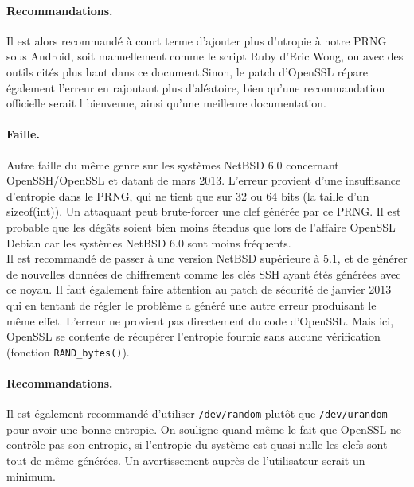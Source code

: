 \paragraph{Recommandations.\\}
Il est alors recommandé à court terme d'ajouter plus d'ntropie à notre PRNG sous Android, soit manuellement comme le script Ruby d'Eric Wong, ou avec des outils cités plus haut dans ce document.Sinon, le patch d'OpenSSL répare également l'erreur en rajoutant plus d'aléatoire, bien qu'une recommandation officielle serait l bienvenue, ainsi qu'une meilleure documentation.

\paragraph{Faille.\\}
Autre faille du même genre sur les systèmes NetBSD 6.0 concernant OpenSSH/OpenSSL et datant de mars 2013. L’erreur provient d’une insuffisance d’entropie dans le PRNG, qui ne tient que sur 32 ou 64 bits (la taille d’un sizeof(int)). Un attaquant peut brute-forcer une clef générée par ce PRNG. Il est probable que les dégâts soient bien moins étendus que lors de l’affaire OpenSSL Debian car les systèmes NetBSD 6.0 sont moins fréquents.\\

Il est recommandé de passer à une version NetBSD supérieure à 5.1, et de générer de nouvelles données de chiffrement comme les clés SSH ayant étés générées avec ce noyau. Il faut également faire attention au patch de sécurité de janvier 2013 qui en tentant de régler le problème a généré une autre erreur produisant le même effet.	L'erreur ne provient pas directement du code d'OpenSSL. Mais ici, OpenSSL se contente de récupérer l'entropie fournie sans aucune vérification (fonction \texttt{RAND\_bytes()}).\\ 

\paragraph{Recommandations.\\}
Il est également recommandé d'utiliser \texttt{/dev/random} plutôt que \texttt{/dev/urandom} pour avoir une bonne entropie. On souligne quand même le fait que OpenSSL ne contrôle pas son entropie, si l'entropie du système est quasi-nulle les clefs sont tout de même générées. Un avertissement auprès de l'utilisateur serait un minimum.\\


